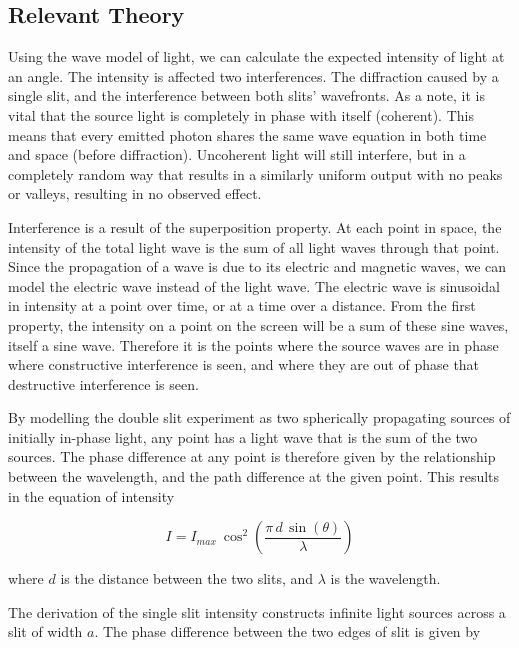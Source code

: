 \subsection*{Relevant Theory}
\label {sec:theory}

Using the wave model of light, we can calculate the expected intensity of light at an angle. The intensity is affected two interferences. The diffraction caused by a single slit, and the interference between both slits' wavefronts. As a note, it is vital that the source light is completely in phase with itself (coherent). This means that every emitted photon shares the same wave equation in both time and space (before diffraction). Uncoherent light will still interfere, but in a completely random way that results in a similarly uniform output with no peaks or valleys, resulting in no observed effect.

Interference is a result of the superposition property. At each point in space, the intensity of the total light wave is the sum of all light waves through that point. Since the propagation of a wave is due to its electric and magnetic waves, we can model the electric wave instead of the light wave. The electric wave is sinusoidal in intensity at a point over time, or at a time over a distance. From the first property, the intensity on a point on the screen will be a sum of these sine waves, itself a sine wave. Therefore it is the points where the source waves are in phase where constructive interference is seen, and where they are out of phase that destructive interference is seen.

By modelling the double slit experiment as two spherically propagating sources of initially in-phase light, any point has a light wave that is the sum of the two sources. The phase difference at any point is therefore given by the relationship between the wavelength, and the path difference at the given point. This results in the equation of intensity 

\begin{equation}
	\label{eqn:DoubleSlitIntensity}
I = I_{max} ~ \cos^2 \left(\frac{\pi \, d \, \sin(\theta)}{\lambda}\right)
\end{equation}

where $d$ is the distance between the two slits, and $\lambda$ is the wavelength.

The derivation of the single slit intensity constructs infinite light sources across a slit of width $a$. The phase difference between the two edges of slit is given by

